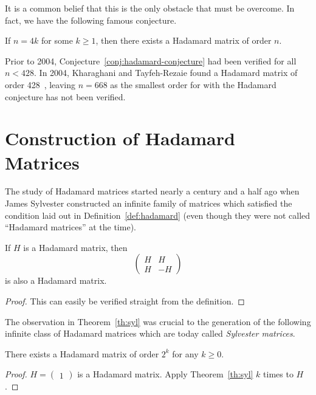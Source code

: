 It is a common belief that this is the only obstacle that must be overcome. In fact, we have the following famous conjecture.

\begin{conjecture} \label{conj:hadamard-conjecture}
 If $n = 4k$ for some $k \geq 1$, then there exists a Hadamard matrix of order $n$.
\end{conjecture}

Prior to 2004, Conjecture~\ref{conj:hadamard-conjecture} had been verified for all $n < 428$. In 2004, Kharaghani and Tayfeh-Rezaie found a Hadamard matrix of order 428~\cite{hada428}, leaving $n = 668$ as the smallest order for with the Hadamard conjecture has not been verified.

\section[Construction of Hadamard Matrices]{Construction of Hadamard Matrices}
\label{sec:construction}

The study of Hadamard matrices started nearly a century and a half ago when James Sylvester constructed an infinite family of matrices which satisfied the condition laid out in Definition~\ref{def:hadamard} (even though they were not called ``Hadamard matrices'' at the time).

\begin{theorem} \label{th:syl}
 If $H$ is a Hadamard matrix, then $$\left(\begin{array}{cc}H&H\\H&-H\end{array}\right)$$ is also a Hadamard matrix.
 \begin{proof}
  This can easily be verified straight from the definition.
 \end{proof}
\end{theorem}

The observation in Theorem~\ref{th:syl} was crucial to the generation of the following infinite class of Hadamard matrices which are today called {\it Sylvester matrices}.

\begin{corollary} \label{cor:syl}
 There exists a Hadamard matrix of order $2^k$ for any $k \geq 0$.
 \begin{proof}
  $H=\left(\begin{array}{c}1\end{array}\right)$ is a Hadamard matrix. Apply Theorem~\ref{th:syl} $k$ times to $H$.
 \end{proof}
\end{corollary}

